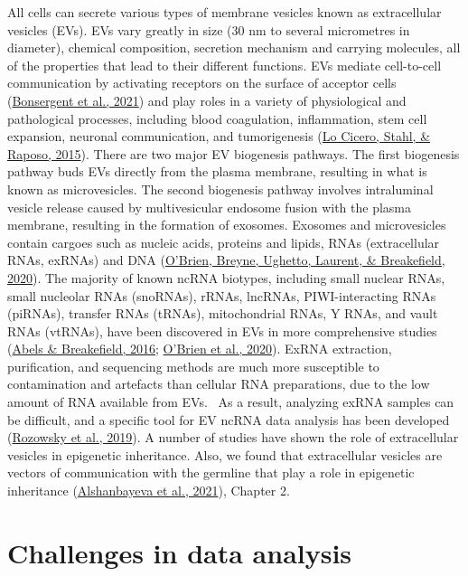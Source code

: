 \documentclass[12pt,twoside]{reedthesis}
\begin{document}
All cells can secrete various types of membrane vesicles known as
extracellular vesicles (EVs). EVs vary greatly in size (30 nm to several
micrometres in diameter), chemical composition, secretion mechanism and
carrying molecules, all of the properties that lead to their different
functions. EVs mediate cell-to-cell communication by activating
receptors on the surface of acceptor cells (\protect\hyperlink{ref-bonsergent2021}{Bonsergent et al., 2021}) and play
roles in a variety of physiological and pathological processes,
including blood coagulation, inflammation, stem cell expansion, neuronal
communication, and tumorigenesis (\protect\hyperlink{ref-locicero2015}{Lo Cicero, Stahl, \& Raposo, 2015}). There are two major EV
biogenesis pathways. The first biogenesis pathway buds EVs directly from
the plasma membrane, resulting in what is known as microvesicles. The
second biogenesis pathway involves intraluminal vesicle release caused
by multivesicular endosome fusion with the plasma membrane, resulting in
the formation of exosomes. Exosomes and microvesicles contain cargoes
such as nucleic acids, proteins and lipids, RNAs (extracellular RNAs,
exRNAs) and DNA (\protect\hyperlink{ref-obrien2020}{O'Brien, Breyne, Ughetto, Laurent, \& Breakefield, 2020}). The majority of known ncRNA biotypes,
including small nuclear RNAs, small nucleolar RNAs (snoRNAs), rRNAs,
lncRNAs, PIWI-interacting RNAs (piRNAs), transfer RNAs (tRNAs),
mitochondrial RNAs, Y RNAs, and vault RNAs (vtRNAs), have been
discovered in EVs in more comprehensive studies (\protect\hyperlink{ref-abels2016}{Abels \& Breakefield, 2016}; \protect\hyperlink{ref-obrien2020}{O'Brien et al., 2020}). ExRNA extraction, purification, and sequencing methods are
much more susceptible to contamination and artefacts than cellular RNA
preparations, due to the low amount of RNA available from EVs.~ As a
result, analyzing exRNA samples can be difficult, and a specific tool
for EV ncRNA data analysis has been developed (\protect\hyperlink{ref-rozowsky2019}{Rozowsky et al., 2019}). A number
of studies have shown the role of extracellular vesicles in epigenetic
inheritance. Also, we found that extracellular vesicles are vectors of
communication with the germline that play a role in epigenetic
inheritance (\protect\hyperlink{ref-alshanbayeva2021}{Alshanbayeva et al., 2021}), Chapter 2.

\hypertarget{challenges-in-data-analysis}{%
\section*{Challenges in data analysis}\label{challenges-in-data-analysis}}
\end{document}
